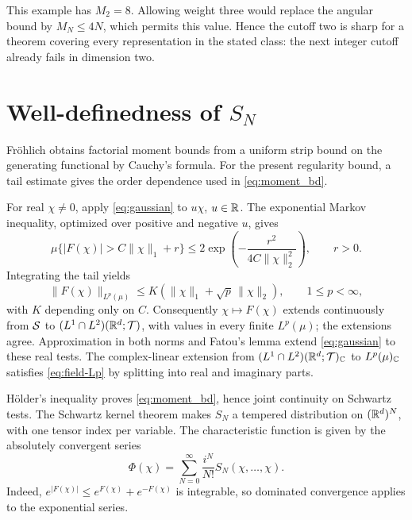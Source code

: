 This example has $M_2=8$. Allowing weight three would replace the
angular bound by $M_N\leq4N$, which permits this value. Hence the
cutoff two is sharp for a theorem covering every representation in
the stated class: the next integer cutoff already fails in dimension
two.

\appendix

\section{Well-definedness of \texorpdfstring{$S_N$}{SN}}\label{sec:well-definedness}

Fr\"ohlich \cite[Lemma~3.2, pp.~276--277]{Frohlich} obtains factorial
moment bounds from a uniform strip bound on the generating functional
by Cauchy's formula. For the present regularity bound, a tail estimate
gives the order dependence used in \eqref{eq:moment_bd}.

For real $\chi\neq0$, apply \eqref{eq:gaussian} to $u\chi$, $u\in\mathbb{R}$.
The exponential Markov inequality, optimized over positive and
negative $u$, gives
\begin{equation}
 \mu\{|F(\chi)|>C\|\chi\|_1+r\}
 \leq2\exp\left(-\frac{r^2}{4C\|\chi\|_2^2}\right),\qquad r>0.
\end{equation}
Integrating the tail yields
\begin{equation}\label{eq:field-Lp}
 \|F(\chi)\|_{L^p(\mu)}\leq K(\|\chi\|_1+\sqrt p\,\|\chi\|_2),
 \qquad1\leq p<\infty,
\end{equation}
with $K$ depending only on $C$. Consequently $\chi\mapsto F(\chi)$
extends continuously from $\mathcal{S}$ to
$(L^1\cap L^2)(\mathbb{R}^d;\mathcal{T})$, with values in every finite $L^p(\mu)$;
the extensions agree. Approximation in both norms and Fatou's lemma
extend \eqref{eq:gaussian} to these real tests. The complex-linear
extension from $(L^1\cap L^2)(\mathbb{R}^d;\mathcal{T})_{\mathbb{C}}$ to
$L^p(\mu)_{\mathbb{C}}$ satisfies
\eqref{eq:field-Lp} by splitting into real and imaginary parts.

H\"older's inequality proves \eqref{eq:moment_bd}, hence joint
continuity on Schwartz tests. The Schwartz kernel theorem makes
$S_N$ a tempered distribution on $(\mathbb{R}^d)^N$, with one tensor index
per variable. The characteristic function is given by the absolutely
convergent series
\begin{equation}
 \Phi(\chi)=\sum_{N=0}^\infty\frac{i^N}{N!}S_N(\chi,\dots,\chi).
\end{equation}
Indeed, $e^{|F(\chi)|}\leq e^{F(\chi)}+e^{-F(\chi)}$ is integrable,
so dominated convergence applies to the exponential series.

